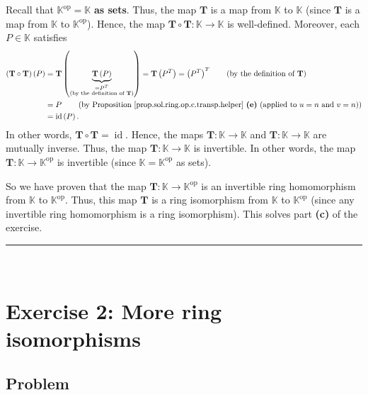\documentclass[paper=a4, fontsize=12pt]{scrartcl}%
\theoremstyle{plainsl}
\theoremstyle{definition}
\theoremstyle{remark}
\begin{document}
Recall that $\mathbb{K}^{\operatorname*{op}}=\mathbb{K}$ \textbf{as sets}.
Thus, the map $\mathbf{T}$ is a map from $\mathbb{K}$ to $\mathbb{K}$ (since
$\mathbf{T}$ is a map from $\mathbb{K}$ to $\mathbb{K}^{\operatorname*{op}}$).
Hence, the map $\mathbf{T}\circ\mathbf{T}:\mathbb{K}\rightarrow\mathbb{K}$ is
well-defined. Moreover, each $P\in\mathbb{K}$ satisfies%
\begin{align*}
\left(  \mathbf{T}\circ\mathbf{T}\right)  \left(  P\right)   &  =\mathbf{T}%
\left(  \underbrace{\mathbf{T}\left(  P\right)  }_{\substack{=P^{T}\\\text{(by
the definition of }\mathbf{T}\text{)}}}\right)  =\mathbf{T}\left(
P^{T}\right)  =\left(  P^{T}\right)  ^{T}\qquad\left(  \text{by the definition
of }\mathbf{T}\right) \\
&  =P\qquad\left(  \text{by Proposition \ref{prop.sol.ring.op.c.transp.helper}
\textbf{(e)} (applied to }u=n\text{ and }v=n\text{)}\right) \\
&  =\operatorname*{id}\left(  P\right)  .
\end{align*}
In other words, $\mathbf{T}\circ\mathbf{T}=\operatorname*{id}$. Hence, the
maps $\mathbf{T}:\mathbb{K}\rightarrow\mathbb{K}$ and $\mathbf{T}%
:\mathbb{K}\rightarrow\mathbb{K}$ are mutually inverse. Thus, the map
$\mathbf{T}:\mathbb{K}\rightarrow\mathbb{K}$ is invertible. In other words,
the map $\mathbf{T}:\mathbb{K}\rightarrow\mathbb{K}^{\operatorname*{op}}$ is
invertible (since $\mathbb{K}=\mathbb{K}^{\operatorname*{op}}$ as sets).

So we have proven that the map $\mathbf{T}:\mathbb{K}\rightarrow
\mathbb{K}^{\operatorname*{op}}$ is an invertible ring homomorphism from
$\mathbb{K}$ to $\mathbb{K}^{\operatorname*{op}}$. Thus, this map $\mathbf{T}$
is a ring isomorphism from $\mathbb{K}$ to $\mathbb{K}^{\operatorname*{op}}$
(since any invertible ring homomorphism is a ring isomorphism). This solves
part \textbf{(c)} of the exercise.

\rule{\linewidth}{0.3pt} \\[0.4cm]

\section{Exercise 2: More ring isomorphisms}

\subsection{Problem}
\end{document}
